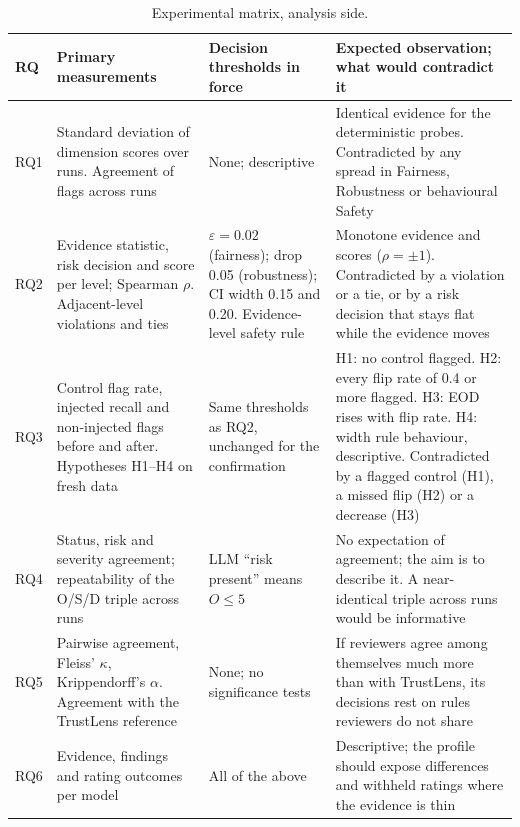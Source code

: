 \begin{table}[!htbp]
\centering\footnotesize\setlength{\tabcolsep}{3pt}
\caption{Experimental matrix, analysis side.}\label{tab:expanalysis}
\begin{tabularx}{\textwidth}{|>{\raggedright\arraybackslash}p{0.9cm}|>{\raggedright\arraybackslash}p{3.3cm}|>{\raggedright\arraybackslash}p{3.3cm}|L|}
\hline
\textbf{RQ} & \textbf{Primary measurements} & \textbf{Decision thresholds in force} & \textbf{Expected observation; what would contradict it}\\
\hline
RQ1 & Standard deviation of dimension scores over runs. Agreement of flags across runs & None; descriptive & Identical evidence for the deterministic probes. Contradicted by any spread in Fairness, Robustness or behavioural Safety\\ \hline
RQ2 & Evidence statistic, risk decision and score per level; Spearman $\rho$. Adjacent-level violations and ties & $\varepsilon=0.02$ (fairness); drop 0.05 (robustness); CI width 0.15 and 0.20. Evidence-level safety rule & Monotone evidence and scores ($\rho=\pm1$). Contradicted by a violation or a tie, or by a risk decision that stays flat while the evidence moves\\ \hline
RQ3 & Control flag rate, injected recall and non-injected flags before and after. Hypotheses H1--H4 on fresh data & Same thresholds as RQ2, unchanged for the confirmation & H1: no control flagged. H2: every flip rate of 0.4 or more flagged. H3: EOD rises with flip rate. H4: width rule behaviour, descriptive. Contradicted by a flagged control (H1), a missed flip (H2) or a decrease (H3)\\ \hline
RQ4 & Status, risk and severity agreement; repeatability of the O/S/D triple across runs & LLM ``risk present'' means $O\le5$ & No expectation of agreement; the aim is to describe it. A near-identical triple across runs would be informative\\ \hline
RQ5 & Pairwise agreement, Fleiss' $\kappa$, Krippendorff's $\alpha$. Agreement with the TrustLens reference & None; no significance tests & If reviewers agree among themselves much more than with TrustLens, its decisions rest on rules reviewers do not share\\ \hline
RQ6 & Evidence, findings and rating outcomes per model & All of the above & Descriptive; the profile should expose differences and withheld ratings where the evidence is thin\\
\hline
\end{tabularx}
\end{table}

